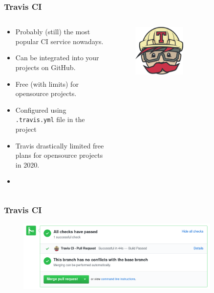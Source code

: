 \documentclass[aspectratio=169]{beamer}
\begin{document}
\begin{frame}
	\frametitle{Travis CI}
	
	\begin{columns}
\begin{column}{0.6\textwidth}
	\begin{block}{}
		\begin{itemize}
			\item Probably (still) the most popular CI service nowadays.
			\item Can be integrated into your projects on GitHub.
			\item Free (with limits) for opensource projects.
			\item Configured using \texttt{.travis.yml} file in the project
			\item Travis drastically limited free plans for opensource projects in 2020\footnotemark.
			\item {}
		\end{itemize}
	\end{block}
\end{column}
\begin{column}{0.4\textwidth}
	\begin{figure}[ht!]
	\begin{center}
  	  \includegraphics[width=0.5\textwidth]{img/travis-logo.png}
	\end{center}
	\end{figure}
\end{column}
\end{columns}

\end{frame}

\begin{frame}
	\frametitle{Travis CI}
	\begin{figure}[ht!]
	\begin{center}
  	  \includegraphics[width=0.9\textwidth]{img/travis-1.png}
	\end{center}
	\end{figure}
\end{frame}
\end{document}
